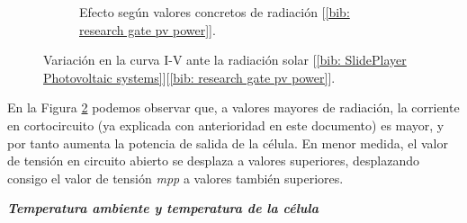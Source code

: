 \documentclass[12pt]{article}
\begin{document}
\begin{figure}[h!]
\begin{subfigure}{0.5\textwidth}
			\caption{Efecto según valores concretos de radiación [\ref{bib: research gate pv power}].}
			\label{fig:variación con valores en la curva I-V de una célula PV con la intensidad de la radiación solar.}
		\end{subfigure}
		\caption{Variación en la curva I-V ante la radiación solar [\ref{bib: SlidePlayer Photovoltaic systems}][\ref{bib: research gate pv power}].}
		\label{fig:variación I-V radiación solar}
	\end{figure}
	
	\noindent En la Figura \ref{fig:variación I-V radiación solar} podemos observar que, a valores mayores de radiación, la corriente en cortocircuito (ya explicada con anterioridad en este documento) es mayor, y por tanto aumenta la potencia de salida de la célula. En menor medida, el valor de tensión en circuito abierto se desplaza a valores superiores, desplazando consigo el valor de tensión \textit{mpp} a valores también superiores. \\
	
	\pagebreak
	
	\noindent \textit{\textbf{Temperatura ambiente y temperatura de la célula}} \\
	
\end{document}
